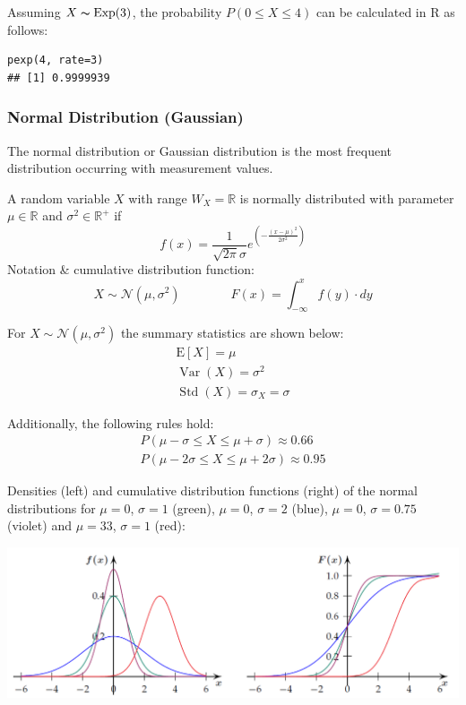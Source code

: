 \documentclass[11pt]{article}
\newcommand*\ev[1]{\mathrel{\text{E}\left[#1\right]}}
\newcommand*\R{\mathbb{R}}
\newcommand*\N[1]{\mathcal{N}\left(#1\right)}
\newcommand*\Var[1]{\mathop{\text{Var}}\left(#1\right)}
\newcommand*\Std[1]{\mathop{\text{Std}}\left(#1\right)}
\begin{document}
Assuming  $X \thicksim \text{Exp}(3)$, the probability $P(0 \leq X \leq 4)$ can be calculated in R as follows:
\begin{verbatim}
pexp(4, rate=3)
## [1] 0.9999939
\end{verbatim}



\subsubsection{Normal Distribution (Gaussian)}
The normal distribution or Gaussian distribution is the most frequent distribution occurring with measurement values.
\begin{definition}
	A random variable $X$ with range $W_X = \R$ is normally distributed with parameter $\mu \in \R$ and $\sigma^2\in\R^+$ if
	\begin{equation*}
	f(x) = \frac{1}{\sqrt{2\pi} \sigma} e^{\left( -\frac{(x-\mu)^2}{2\sigma^2} \right)}
	\end{equation*}
	Notation \& cumulative distribution function:
	\begin{equation*}
		X \sim \N{\mu,\sigma^2} \quad \quad \quad \quad F(x) = \int_{-\infty}^{x} f(y)\cdot dy
	\end{equation*}
\end{definition}

For $X \sim \N{\mu,\sigma^2}$ the summary statistics are shown below:
\begin{gather*}
	\ev{X} = \mu\\
	\Var{X} = \sigma^2\\
	\Std{X}=\sigma_X = \sigma
\end{gather*}

Additionally, the following rules hold:
\begin{gather*}
	P(\mu-\sigma \leq X \leq \mu+\sigma) \approx 0.66\\
	P(\mu-2 \sigma \leq X \leq \mu+2 \sigma) \approx 0.95
\end{gather*}

Densities (left) and cumulative distribution functions (right) of the normal distributions for $\mu = 0$, $\sigma = 1$ (green), $\mu = 0$, $\sigma = 2$ (blue), $\mu = 0$, $\sigma = 0.75$ (violet) and $\mu = 33$, $\sigma = 1$  (red):

\begin{center}
	\includegraphics[width=0.9\linewidth]{img/gaussian-distribution}
\end{center}
\end{document}

